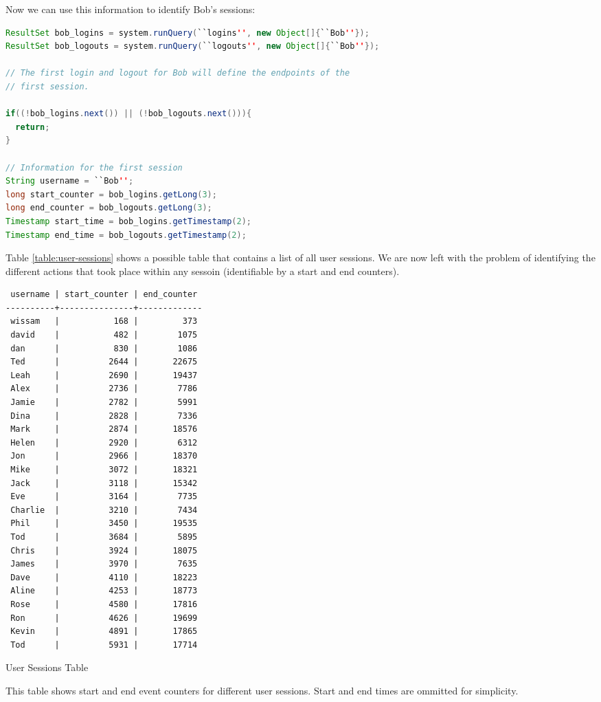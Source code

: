\noindent
Now we can use this information to identify Bob's sessions:

\begin{lstlisting}[language=Java]
ResultSet bob_logins = system.runQuery(``logins'', new Object[]{``Bob''});
ResultSet bob_logouts = system.runQuery(``logouts'', new Object[]{``Bob''});

// The first login and logout for Bob will define the endpoints of the
// first session.

if((!bob_logins.next()) || (!bob_logouts.next())){
  return;
}

// Information for the first session
String username = ``Bob'';
long start_counter = bob_logins.getLong(3);
long end_counter = bob_logouts.getLong(3);
Timestamp start_time = bob_logins.getTimestamp(2);
Timestamp end_time = bob_logouts.getTimestamp(2);
\end{lstlisting}

Table \ref{table:user-sessions} shows a possible table that contains a list of all user sessions. We are now left with the problem of identifying the different actions that took place within any sessoin (identifiable by a start and end counters).

\begin{table}
\begin{verbatim}
 username | start_counter | end_counter 
----------+---------------+-------------
 wissam   |           168 |         373
 david    |           482 |        1075
 dan      |           830 |        1086
 Ted      |          2644 |       22675
 Leah     |          2690 |       19437
 Alex     |          2736 |        7786
 Jamie    |          2782 |        5991
 Dina     |          2828 |        7336
 Mark     |          2874 |       18576
 Helen    |          2920 |        6312
 Jon      |          2966 |       18370
 Mike     |          3072 |       18321
 Jack     |          3118 |       15342
 Eve      |          3164 |        7735
 Charlie  |          3210 |        7434
 Phil     |          3450 |       19535
 Tod      |          3684 |        5895
 Chris    |          3924 |       18075
 James    |          3970 |        7635
 Dave     |          4110 |       18223
 Aline    |          4253 |       18773
 Rose     |          4580 |       17816
 Ron      |          4626 |       19699
 Kevin    |          4891 |       17865
 Tod      |          5931 |       17714
\end{verbatim}
\caption*{User Sessions Table}
\caption{This table shows start and end event counters for different user sessions. Start and end times are ommitted for simplicity.}
\label{table:user-sessions}
\end{table}

